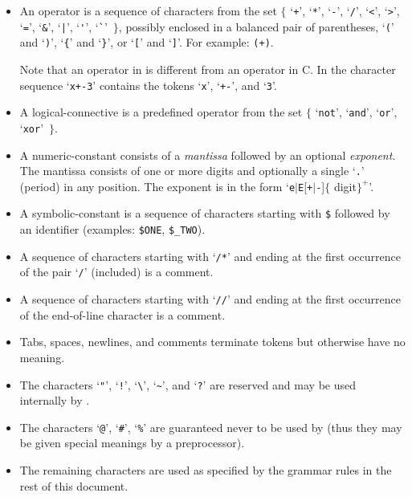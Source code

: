 \begin{itemize}
\item  An {\nont operator} is a sequence of characters from the set $\{$
`\verb|+|',
`\verb|*|',
`\verb|-|',
`\verb|/|',
`\verb|<|',
`\verb|>|',
`\verb|=|',
`\verb|&|',
`\verb,|,',
`\verb|'|',
`\verb|`|'~$\}$, possibly enclosed in a balanced pair of parentheses,
`\verb|(|' and 
`\verb|)|',
`\verb|{|' and 
`\verb|}|', or
`\verb|[|' and 
`\verb|]|'.  For example: \verb.(+)..

Note that an operator in \Shift{} is  different from an operator in C. 
In \Shift{} the character sequence
`{\tt x+-3}' contains the tokens `{\tt x}', `{\tt +-}', and `{\tt 3}'.

\item A {\nont logical-connective} is a predefined operator from the set $\{$
`\verb|not|',
`\verb|and|',
`\verb|or|',
`\verb|xor|'~$\}$.

\item A {\nont numeric-constant} consists of a {\em mantissa} followed
by an optional {\em exponent}.  The mantissa consists of one or more
digits and optionally a single `\verb,.,' (period) in any position.
The exponent is in the form `{\tt e$|$E}[{\tt +}$|${\tt -}]$\{${\nont
digit}$\}^+$'.

\item A {\nont symbolic-constant} is a sequence of characters
starting with \verb.$. followed by an identifier (examples:
\verb.$ONE., \verb.$_TWO.).


\item A sequence of characters starting with `{\tt /*}' and ending at
the first occurrence of the pair `{\tt */}' (included) is a
comment.

\item A sequence of characters starting with `{\tt //}' and ending at
the first occurrence of the end-of-line character is a comment.

\item Tabs, spaces, newlines, and comments terminate tokens but
otherwise have no meaning.

\item The characters `\verb|"|', `\verb|!|', `\verb|\|', `\verb|~|', and
`\verb|?|' are reserved and may be used internally by \todaysname{}.

\item The characters `\verb|@|', `\verb|#|', `\verb|%|' are guaranteed
never to be used by \todaysname{} (thus they may be given special
meanings by a preprocessor).

\item The remaining characters are used as specified by the grammar
rules in the rest of this document.

\end{itemize}

